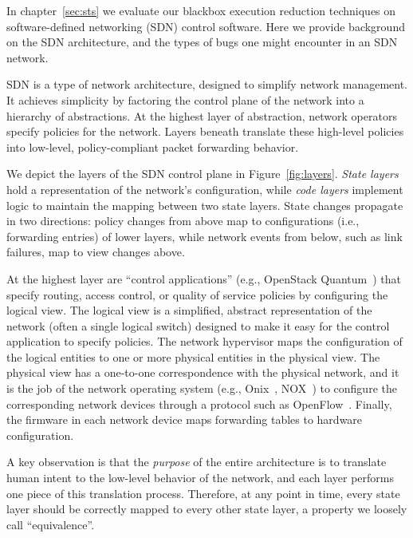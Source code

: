 In chapter~\ref{sec:sts} we evaluate our blackbox execution reduction
techniques on
software-defined networking (SDN) control software.
Here we provide background on the SDN architecture, and the types of bugs one
might encounter in an SDN network.

SDN is a type of network architecture, designed to simplify network management. It
achieves simplicity by factoring the control plane of the network into a hierarchy of
abstractions. At the highest layer of abstraction, network operators specify
policies for the network. Layers beneath translate these high-level
policies into low-level, policy-compliant packet forwarding behavior.

We depict the layers of the SDN control plane in Figure~\ref{fig:layers}.  \emph{State layers} 
hold a representation of the network's configuration, while \emph{code layers} implement logic to maintain the mapping between two state layers. State changes propagate in two directions: policy changes from above map to configurations (i.e., forwarding entries) of lower layers, while network events from below, such as link failures, map to view changes above.

At the highest layer are ``control applications'' (e.g., OpenStack
                                                   Quantum~\cite{quantum})
that specify routing, access control, or quality of service policies by
configuring the logical view. The logical view is a simplified,
abstract representation of the network (often a single logical switch)
designed to make it easy for the control application to specify policies.
The network hypervisor maps the configuration of the logical entities to one
or more physical entities in the physical view. The physical view has a one-to-one
correspondence with the physical network, and it is the job of the network
operating system (e.g., Onix~\cite{onix}, NOX~\cite{nox}) to
configure the corresponding network devices through a protocol such as OpenFlow~\cite{openflow}.
Finally, the firmware in each network device maps forwarding tables to hardware configuration.


A key observation is that the {\em purpose} of the entire architecture is to translate human intent to
the low-level behavior of the network, and each layer performs one piece of this
translation process. Therefore, at any point in time, every state layer should be
correctly mapped to every other state layer, a property we loosely call ``equivalence''.

